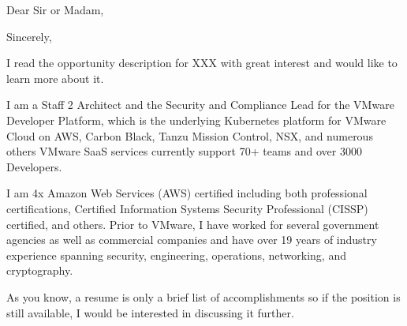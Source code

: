 \thispagestyle{empty}
\opening{Dear Sir or Madam,}
\closing{Sincerely,}
\makelettertitle

I read the opportunity description for XXX with great interest and would like to learn more about it.

I am a Staff 2 Architect and the Security and Compliance Lead for the VMware Developer Platform, which is the underlying Kubernetes platform for VMware Cloud on AWS, Carbon Black, Tanzu Mission Control, NSX, and numerous others VMware SaaS services currently support 70+ teams and over 3000 Developers.

I am 4x Amazon Web Services (AWS) certified including both professional certifications, Certified Information Systems Security Professional (CISSP) certified, and others. Prior to VMware, I have worked for several government agencies as well as commercial companies and have over 19 years of industry experience spanning security, engineering, operations, networking, and cryptography.

As you know, a resume is only a brief list of accomplishments so if the position is still available, I would be interested in discussing it further.

\makeletterclosing
\clearpage
\setcounter{page}{1}
